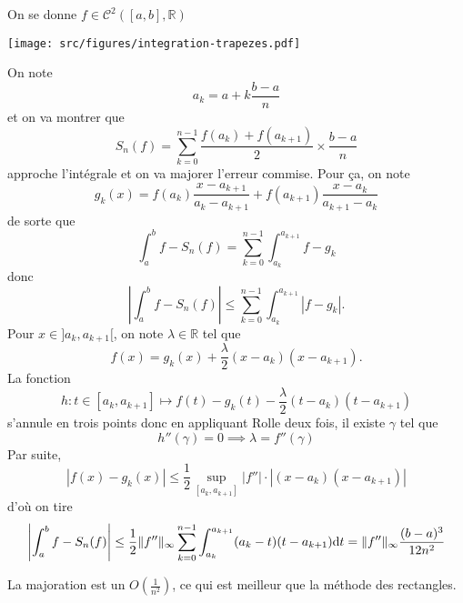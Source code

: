 On se donne $f\in\mathcal C^2([a, b], \mathbb R)$
\begin{center}
    \texttt{[image: src/figures/integration-trapezes.pdf]}
\end{center}
On note
    \[
        a_k=a+k\frac{b-a}n
    \]
et on va montrer que \[
    S_n(f)=\sum_{k=0}^{n-1}\frac{f(a_k)+f(a_{k+1})}2\times \frac{b-a}n
\]
approche l'intégrale et on va majorer l'erreur commise. Pour ça, on note \[
    g_k(x)=f(a_k)\frac{x-a_{k+1}}{a_k-a_{k+1}}+f(a_{k+1})\frac{x-a_k}{a_{k+1}-a_k}
\]
de sorte que \[
    \int_a^bf-S_n(f)=\sum_{k=0}^{n-1}\int_{a_k}^{a_{k+1}}f-g_k
\]
donc \[
    \left| \int_a^bf-S_n(f) \right|\leq \sum_{k=0}^{n-1}\int_{a_k}^{a_{k+1}}|f-g_k|.
\]
Pour $x\in]a_k, a_{k+1}[$, on note $\lambda\in\mathbb R$ tel que \[
    f(x)=g_k(x)+\frac\lambda2(x-a_k)(x-a_{k+1}).
\]
La fonction \[
    h:t\in[a_k, a_{k+1}]\longmapsto f(t)-g_k(t)-\frac\lambda2(t-a_k)(t-a_{k+1})
\]
s'annule en trois points donc en appliquant Rolle deux fois, il existe $\gamma$ tel que \[
    h''(\gamma)=0\implies \lambda=f''(\gamma)
\]
Par suite, \[
    |f(x)-g_k(x)|\leq \frac12\sup_{[a_k, a_{k+1}]}|f''|\cdot |(x-a_k)(x-a_{k+1})|
\]
d'où on tire \[
    \left| \int_a^bf-S_n(f) \right|\leq \frac12\|f''\|_{\infty}\sum_{k=0}^{n-1}\int_{a_k}^{a_{k+1}}(a_k-t)(t-a_{k+1})\mathrm{d} t=\|f''\|_{\infty}\frac{(b-a)^3}{12n^2}
\]

\begin{rem}
    La majoration est un $O \left( \frac1{n^2} \right)$, ce qui est meilleur que la méthode des rectangles.
\end{rem}

\endchapter
